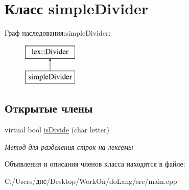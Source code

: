 \hypertarget{classsimple_divider}{}\section{Класс simple\+Divider}
\label{classsimple_divider}
Граф наследования\+:simple\+Divider\+:\begin{figure}[H]
\begin{center}
\leavevmode
\includegraphics[height=2.000000cm]{classsimple_divider}
\end{center}
\end{figure}
\subsection*{Открытые члены}
\begin{DoxyCompactItemize}
\item 
\mbox{\label{classsimple_divider_aa571e9a8bb1df785ac0f05ad16434241}} 
virtual bool \hyperlink{classsimple_divider_aa571e9a8bb1df785ac0f05ad16434241}{is\+Divide} (char letter)
\begin{DoxyCompactList}\small\item\em Метод для разделения строк на лексемы \end{DoxyCompactList}\end{DoxyCompactItemize}


Объявления и описания членов класса находятся в файле\+:\begin{DoxyCompactItemize}
\item 
C\+:/\+Users/днс/\+Desktop/\+Work\+On/do\+Lang/src/main.\+cpp\end{DoxyCompactItemize}
